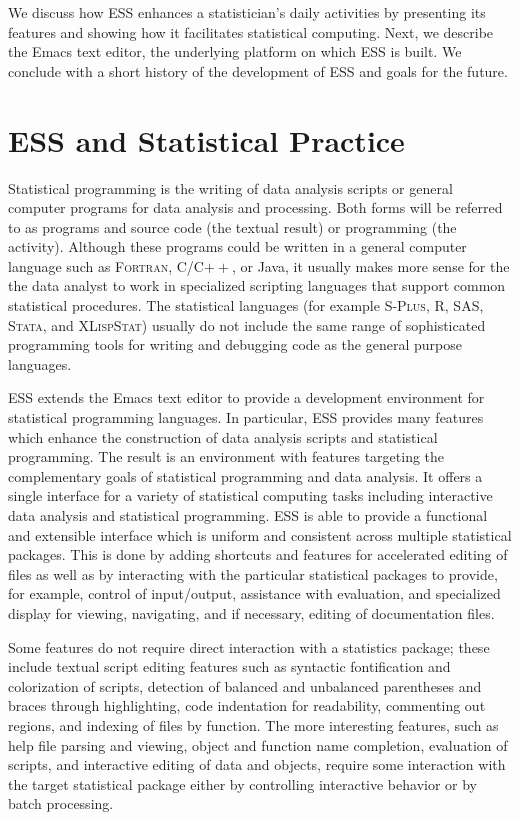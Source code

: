 \documentclass{article}
\newcommand*{\SAS}{\textsc{SAS}}
\newcommand*{\Splus}{\textsc{S-Plus}}
\newcommand*{\XLispStat}{\textsc{XLispStat}}
\newcommand*{\Stata}{\textsc{Stata}}
\newcommand*{\Fortran}{\textsc{Fortran}}
\begin{document}
We discuss how ESS enhances a statistician's daily activities by
presenting its features and showing how it facilitates statistical
computing.  Next, we describe the Emacs text editor, the underlying
platform on which ESS is built.  We conclude with a short history of
the development of ESS and goals for the future.

\section{ESS and Statistical Practice}
\label{sec:ess-extends-emacs}

Statistical programming is the writing of data analysis scripts or
general computer programs for data analysis and processing.  Both
forms will be referred to as programs and source code (the textual
result) or programming (the activity).  Although these programs could be written
in a general computer language such as \Fortran, C/C$++$, or Java,
it usually makes more sense for the the data analyst to work in
specialized scripting languages that support common statistical
procedures.  The statistical languages (for example
\Splus, R, \SAS, \Stata, and \XLispStat) usually
do not include the same range of sophisticated programming tools for
writing and debugging code as the general purpose languages.

ESS extends the Emacs text editor to provide a development environment
for statistical programming languages. In particular, ESS provides
many features which enhance the construction of data analysis scripts
and statistical programming.  The result is an environment with
features targeting the complementary goals of statistical programming
and data analysis.  It offers a single interface for a variety of
statistical computing tasks including interactive data analysis and
statistical programming.  ESS is able to provide a functional and
extensible interface which is uniform and consistent across multiple
statistical packages.  This is done by adding shortcuts and features
for accelerated editing of files as well as by interacting with the
particular statistical packages to provide, for example, control of
input/output, assistance with evaluation, and specialized display for
viewing, navigating, and if necessary, editing of  documentation
files.

Some features do not require direct interaction with a statistics
package; these include textual script editing features such as
syntactic fontification and colorization of scripts, detection of
balanced and unbalanced parentheses and braces through highlighting,
code indentation for readability, commenting out regions, and indexing
of files by function.  The more interesting features, such as help
file parsing and viewing, object and function name completion,
evaluation of scripts, and interactive editing of data and objects,
require some interaction with the target statistical package either by
controlling interactive behavior or by batch processing.
\end{document}
